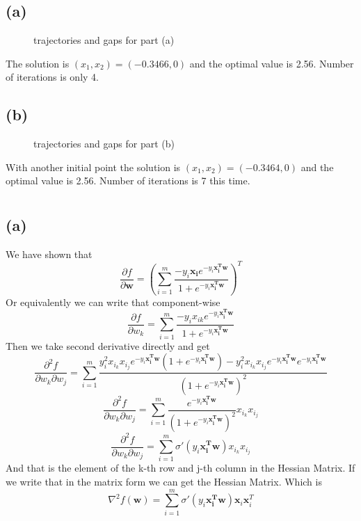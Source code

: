 \documentclass[12pt,letterpaper]{article}
\begin{document}
\section{}
\subsection*{(a)}
\begin{figure}[htbp]
\centering
{}
\caption{trajectories and gaps for part (a)}
\label{trandgap1a}
\end{figure}
The solution is $(x_1,x_2)=(-0.3466,0)$ and the optimal value is 2.56. Number of iterations is only 4.

\subsection*{(b)}
\begin{figure}[htbp]
\centering
{}
\caption{trajectories and gaps for part (b)}
\label{trandgap1b}
\end{figure}
With another initial point the solution is $(x_1,x_2)=(-0.3464,0)$ and the optimal value is 2.56. Number of iterations is 7 this time.

\section{}
\subsection*{(a)}
We have shown that 
$$\frac{\partial f}{\partial \boldsymbol{w}}=(\sum_{i=1}^{m}\frac{-y_i\boldsymbol{x_{i}}e^{-y_i\boldsymbol{x_{i}^{T}w}}}{1+e^{-y_i\boldsymbol{x_{i}^{T}w}}})^T$$
Or equivalently we can write that component-wise
$$\frac{\partial f}{\partial w_k}=\sum_{i=1}^{m}\frac{-y_ix_{ik}e^{-y_i\boldsymbol{x_{i}^{T}w}}}{1+e^{-y_i\boldsymbol{x_{i}^{T}w}}}$$
Then we take second derivative directly and get
$$\frac{\partial^2 f}{\partial w_k\partial w_j}=\sum_{i=1}^{m}\frac{y_i^2x_{i_k}x_{i_j}e^{-y_i\boldsymbol{x_{i}^{T}w}}(1+e^{-y_i\boldsymbol{x_{i}^{T}w}})-y_i^2x_{i_k}x_{i_j}e^{-y_i\boldsymbol{x_{i}^{T}w}}e^{-y_i\boldsymbol{x_{i}^{T}w}}}{(1+e^{-y_i\boldsymbol{x_{i}^{T}w}})^2}$$
$$\frac{\partial^2 f}{\partial w_k\partial w_j}=\sum_{i=1}^{m}\frac{e^{-y_i\boldsymbol{x_{i}^{T}w}}}{(1+e^{-y_i\boldsymbol{x_{i}^{T}w}})^2}x_{i_k}x_{i_j}$$
$$\frac{\partial^2 f}{\partial w_k\partial w_j}=\sum_{i=1}^{m}\sigma'(y_i\boldsymbol{x_{i}^{T}w}) x_{i_k}x_{i_j}$$
And that is the element of the k-th row and j-th column in the Hessian Matrix. If we write that in the matrix form we can get the Hessian Matrix. Which is 
$$\nabla^2f(\boldsymbol{w})=\sum_{i=1}^{m}\sigma'(y_i\boldsymbol{x_{i}^{T}w})\boldsymbol{x}_i\boldsymbol{x}_i^T$$
\end{document}
